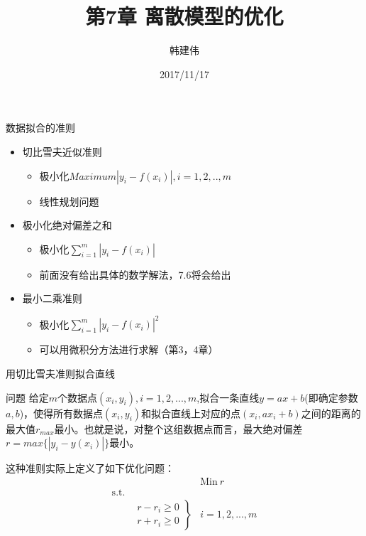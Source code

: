 \documentclass[mathserif, table]{beamer}
\title{第7章 离散模型的优化}
\author{韩建伟}
\institute{
  信息学院\\
  \texttt{mm@hanjianwei.com}
}
\date{2017/11/17}
\begin{document}
\begin{frame}[plain]
  \titlepage{}
\end{frame}

\begin{frame}{数据拟合的准则}

  \begin{itemize}
  \item 切比雪夫近似准则
    \begin{itemize}
    \item 极小化$Maximum |y_i - f(x_i)|,  i = 1, 2, .., m$
    \item 线性规划问题
    \end{itemize}
  \item 极小化绝对偏差之和 
    \begin{itemize}
    \item 极小化$\sum_{i=1}^m |y_i - f(x_i)|$
    \item 前面没有给出具体的数学解法，7.6将会给出
    \end{itemize}
  \item 最小二乘准则 
    \begin{itemize}
    \item 极小化$\sum_{i=1}^m |y_i - f(x_i)|^2$
    \item 可以用微积分方法进行求解（第3，4章）
    \end{itemize}
  \end{itemize}
  
\end{frame}

\begin{frame}{用切比雪夫准则拟合直线}
  \begin{block}{问题}
    给定$m$个数据点$(x_i, y_i), i=1, 2, ..., m$,拟合一条直线$y=ax+b$(即确定参数$a, b$)，使得所有数据点$(x_i, y_i)$和拟合直线上对应的点$(x_i, ax_i+b)$之间的距离的最大值$r_{max}$最小。也就是说，对整个这组数据点而言，最大绝对偏差$r=max\{|y_i-y(x_i)|\}$最小。
  \end{block}

  这种准则实际上定义了如下优化问题：
  \[ 
  \begin{array}{lcl}
    & & \mbox{Min}\ r \\
    \mbox{s.t.} & &  \\
    &
    \left.
      \begin{array}{c}
        r-r_i \ge 0\\
        r+r_i \ge 0
      \end{array}
    \right\}& i = 1, 2, ... , m
  \end{array}
  \]
\end{frame}
\end{document}
